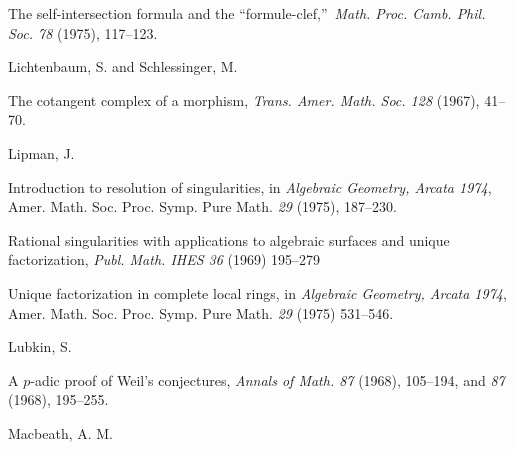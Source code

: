 {\noindent\hangindent=25bp\hspace*{6bp}%
The self-intersection formula and the \textquotedblleft formule-clef,\textquotedblright\ \emph{Math. Proc. Camb. Phil. Soc. 78} (1975), 117--123.\par
\par\vspace{2.15pt}\noindent \hypertarget{bib-479-6}{}Lichtenbaum, S. and Schlessinger, M.\par
\noindent\hangindent=25bp\hspace*{6bp}%
The cotangent complex of a morphism, \emph{Trans. Amer. Math. Soc. 128} (1967), 41--70.\par
\par\vspace{2.15pt}\noindent \hypertarget{bib-479-7}{}Lipman, J.\par
\noindent\hangindent=25bp\hspace*{6bp}%
Introduction to resolution of singularities, in \emph{Algebraic Geometry, Arcata 1974}, Amer. Math. Soc. Proc. Symp. Pure Math. \emph{29} (1975), 187--230.\par
\noindent\hangindent=25bp\hspace*{6bp}%
Rational singularities with applications to algebraic surfaces and unique factorization, \emph{Publ. Math. IHES 36} (1969) 195--279\par
\noindent\hangindent=25bp\hspace*{6bp}%
Unique factorization in complete local rings, in \emph{Algebraic Geometry, Arcata 1974}, Amer. Math. Soc. Proc. Symp. Pure Math. \emph{29} (1975) 531--546.\par
\par\vspace{2.15pt}\noindent \hypertarget{bib-479-10}{}Lubkin, S.\par
\noindent\hangindent=25bp\hspace*{6bp}%
A $p$-adic proof of Weil's conjectures, \emph{Annals of Math. 87} (1968), 105--194, and \emph{87} (1968), 195--255.\par
\par\vspace{2.15pt}\noindent \hypertarget{bib-479-11}{}Macbeath, A. M.\par
}
